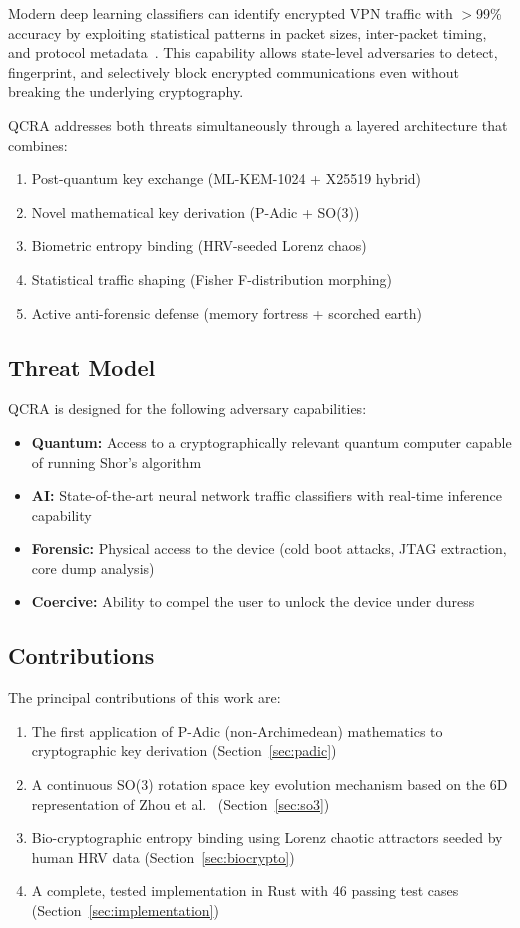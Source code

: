 \documentclass[11pt,a4paper]{article}
\begin{document}
Modern deep learning classifiers can identify encrypted VPN traffic with
$>$99\% accuracy by exploiting statistical patterns in packet sizes,
inter-packet timing, and protocol metadata~\cite{draper2016}. This
capability allows state-level adversaries to detect, fingerprint, and
selectively block encrypted communications even without breaking the
underlying cryptography.

QCRA addresses both threats simultaneously through a layered architecture
that combines:
\begin{enumerate}[nosep]
  \item Post-quantum key exchange (ML-KEM-1024 + X25519 hybrid)
  \item Novel mathematical key derivation (P-Adic + SO(3))
  \item Biometric entropy binding (HRV-seeded Lorenz chaos)
  \item Statistical traffic shaping (Fisher F-distribution morphing)
  \item Active anti-forensic defense (memory fortress + scorched earth)
\end{enumerate}

\subsection{Threat Model}

QCRA is designed for the following adversary capabilities:
\begin{itemize}[nosep]
  \item \textbf{Quantum:} Access to a cryptographically relevant quantum
    computer capable of running Shor's algorithm
  \item \textbf{AI:} State-of-the-art neural network traffic classifiers
    with real-time inference capability
  \item \textbf{Forensic:} Physical access to the device (cold boot
    attacks, JTAG extraction, core dump analysis)
  \item \textbf{Coercive:} Ability to compel the user to unlock the
    device under duress
\end{itemize}

\subsection{Contributions}

The principal contributions of this work are:
\begin{enumerate}[nosep]
  \item The first application of P-Adic (non-Archimedean) mathematics to
    cryptographic key derivation (Section~\ref{sec:padic})
  \item A continuous SO(3) rotation space key evolution mechanism based on
    the 6D representation of Zhou et al.~\cite{zhou2019} (Section~\ref{sec:so3})
  \item Bio-cryptographic entropy binding using Lorenz chaotic attractors
    seeded by human HRV data (Section~\ref{sec:biocrypto})
  \item A complete, tested implementation in Rust with 46 passing test
    cases (Section~\ref{sec:implementation})
\end{enumerate}
\end{document}
